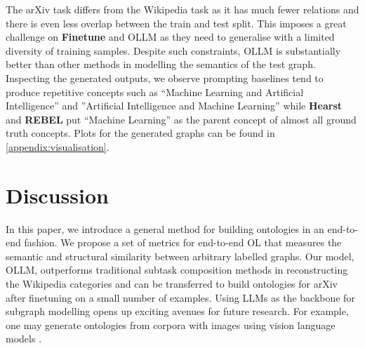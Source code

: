 \documentclass{article}
\newcommand{\name}{{OLLM}\xspace}
\begin{document}
The arXiv task differs from the Wikipedia task as it has much fewer relations and there is even less overlap between the train and test split. This imposes a great challenge on \textbf{Finetune} and \name as they need to generalise with a limited diversity of training samples. Despite such constraints, \name is substantially better than other methods in modelling the semantics of the test graph. Inspecting the generated outputs, we observe prompting baselines tend to produce repetitive concepts such as ``Machine Learning and Artificial Intelligence'' and ''Artificial Intelligence and Machine Learning'' while \textbf{Hearst} and \textbf{REBEL} put ``Machine Learning'' as the parent concept of almost all ground truth concepts. Plots for the generated graphs can be found in \cref{appendix:visualisation}.





\section{Discussion}

In this paper, we introduce a general method for building ontologies in an end-to-end fashion. We propose a set of metrics for end-to-end OL that measures the semantic and structural similarity between arbitrary labelled graphs. Our model, \name, outperforms traditional subtask composition methods in reconstructing the Wikipedia categories and can be transferred to build ontologies for arXiv after finetuning on a small number of examples. Using LLMs as the backbone for subgraph modelling opens up exciting avenues for future research. For example, one may generate ontologies from corpora with images using vision language models \cite{donahue2015long}.
\end{document}
